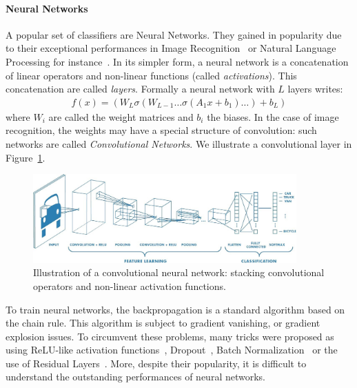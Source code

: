 \paragraph{Neural Networks} A popular set of classifiers are Neural Networks. They gained in popularity due to their exceptional performances in Image Recognition~\citep{krizhevsky2012imagenet,he2016deep} or Natural Language Processing for instance~\citep{vaswani2017attention}. In its simpler form, a neural network is a concatenation of linear operators and non-linear functions (called \emph{activations}). This concatenation are called \emph{layers}. Formally a neural network with $L$ layers writes:
\begin{align*}
    f(x) = \left(W_L\sigma\left(W_{L-1}\dots \sigma\left(A_1x+b_1\right)\dots\right)+b_L\right)
\end{align*}
where $W_i$ are called the weight matrices and $b_i$ the biases. In the case of image recognition, the weights may have a special structure of convolution: such networks are called \emph{Convolutional Networks}. We illustrate a convolutional layer in Figure~\ref{fig:convnet}.

\begin{figure}
    \centering
    \includegraphics[width=0.9\textwidth]{Images/conv_net.jpeg}
    \caption{Illustration of a convolutional neural network: stacking convolutional operators and non-linear activation functions.}
    \label{fig:convnet}
\end{figure}

To train neural networks, the backpropagation is a standard algorithm based on the chain rule. This algorithm is subject to gradient vanishing, or gradient explosion issues. To circumvent these problems, many tricks were proposed as  using ReLU-like activation functions~\citep{xu2015empirical,ramachandran2017searching}, Dropout~\citep{srivastava2014dropout}, Batch Normalization~\citep{ioffe2015batch} or the use of Residual Layers~\citep{he2016deep}. More, despite their popularity, it is difficult to understand the outstanding performances of neural networks.



